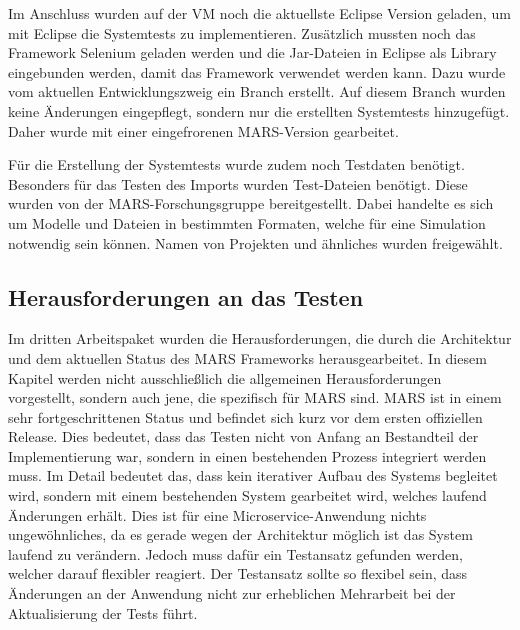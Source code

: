 \documentclass{llncs}
\begin{document}
Im Anschluss wurden auf der VM noch die aktuellste Eclipse Version geladen, um mit Eclipse die Systemtests zu implementieren. Zusätzlich mussten noch das Framework Selenium geladen werden und die Jar-Dateien in Eclipse als Library eingebunden werden, damit das Framework verwendet werden kann. Dazu wurde vom aktuellen Entwicklungszweig ein Branch erstellt. Auf diesem Branch wurden keine Änderungen eingepflegt, sondern nur die erstellten Systemtests hinzugefügt. Daher wurde mit einer eingefrorenen MARS-Version gearbeitet.

Für die Erstellung der Systemtests wurde zudem noch Testdaten benötigt. Besonders für das Testen des Imports wurden Test-Dateien benötigt. Diese wurden von der MARS-Forschungsgruppe bereitgestellt. Dabei handelte es sich um Modelle und Dateien in bestimmten Formaten, welche für eine Simulation notwendig sein können. Namen von Projekten und ähnliches wurden freigewählt.

\subsection{Herausforderungen an das Testen}
Im dritten Arbeitspaket wurden die Herausforderungen, die durch die Architektur und dem aktuellen Status des MARS Frameworks herausgearbeitet. In diesem Kapitel werden nicht ausschließlich die allgemeinen Herausforderungen vorgestellt, sondern auch jene, die spezifisch für MARS sind. MARS ist in einem sehr fortgeschrittenen Status und befindet sich kurz vor dem ersten offiziellen Release. Dies bedeutet, dass das Testen nicht von Anfang an Bestandteil der Implementierung war, sondern in einen bestehenden Prozess integriert werden muss. Im Detail bedeutet das, dass kein iterativer Aufbau des Systems begleitet wird, sondern mit einem bestehenden System gearbeitet wird, welches laufend Änderungen erhält. Dies ist für eine Microservice-Anwendung nichts ungewöhnliches, da es gerade wegen der Architektur möglich ist das System laufend zu verändern. Jedoch muss dafür ein Testansatz gefunden werden, welcher darauf flexibler reagiert. Der Testansatz sollte so flexibel sein, dass Änderungen an der Anwendung nicht zur erheblichen Mehrarbeit bei der Aktualisierung der Tests führt.
\end{document}
